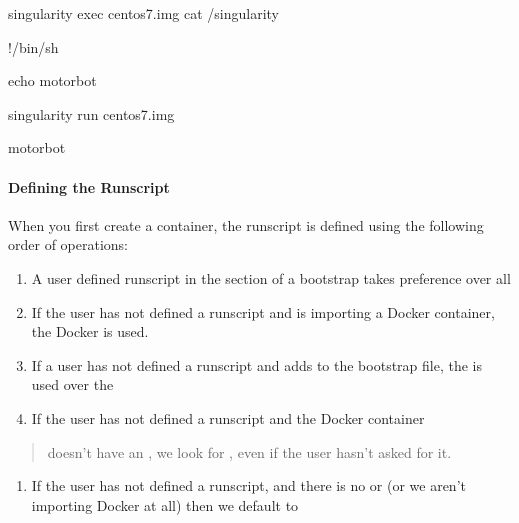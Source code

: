 \documentclass[letterpaper,10pt,english]{sphinxmanual}
\begin{document}
%
\begin{sphinxVerbatim}[commandchars=\\\{\}]
\PYGZdl{} singularity exec centos7.img cat /singularity

\PYGZsh{}!/bin/sh


echo motorbot


\PYGZdl{} singularity run centos7.img

motorbot
\end{sphinxVerbatim}


\paragraph{Defining the Runscript}
\label{\detokenize{appendix:defining-the-runscript}}
When you first create a container, the runscript is defined using the
following order of operations:
\begin{enumerate}
\item {} 
A user defined runscript in the  section of a bootstrap takes
preference over all

\item {} 
If the user has not defined a runscript and is importing a Docker
container, the Docker  is used.

\item {} 
If a user has not defined a runscript and adds  to the bootstrap file,
the  is used over the 

\item {} 
If the user has not defined a runscript and the Docker container

\end{enumerate}
\begin{quote}

doesn’t have an , we look for , even if the user hasn’t asked for it.
\end{quote}
\begin{enumerate}
\item {} 
If the user has not defined a runscript, and there is no  or  (or we
aren’t importing Docker at all) then we default to 

\end{enumerate}
\end{document}
